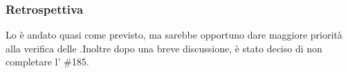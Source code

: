 \subsubsection{Retrospettiva}
Lo  è andato quasi come previsto, ma sarebbe opportuno dare maggiore priorità alla verifica delle .Inoltre dopo una breve discussione, è stato deciso di non completare l' \#185.